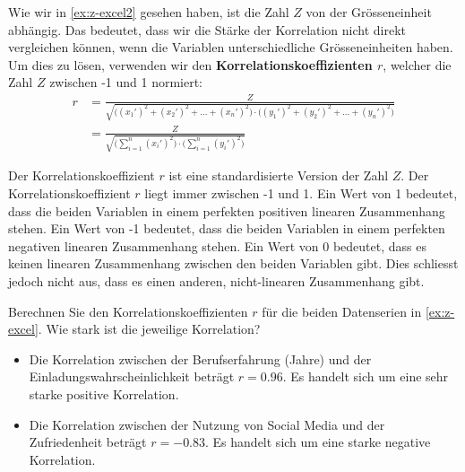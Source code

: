 Wie wir in \cref{ex:z-excel2} gesehen haben, ist die Zahl \(Z\) von der Grösseneinheit abhängig. Das bedeutet, dass wir die Stärke der Korrelation nicht direkt vergleichen können, wenn die Variablen unterschiedliche Grösseneinheiten haben. Um dies zu lösen, verwenden wir den \textbf{Korrelationskoeffizienten \(r\)}, welcher die Zahl \(Z\) zwischen -1 und 1 normiert:
\begin{equation}
    \begin{aligned}
        r      & = \frac{Z}{\sqrt{\Big((x_1')^2 + (x_2')^2 + \dots + (x_n')^2\Big) \cdot \Big((y_1')^2 + (y_2')^2 + \dots + (y_n')^2\Big)}} \\
         & = \frac{Z}{\sqrt{\Big(\sum_{i=1}^n (x_i')^2\Big) \cdot \Big(\sum_{i=1}^n (y_i')^2\Big)}}
    \end{aligned}
\end{equation}


Der Korrelationskoeffizient \(r\) ist eine standardisierte Version der Zahl \(Z\). Der Korrelationskoeffizient \(r\) liegt immer zwischen -1 und 1. Ein Wert von 1 bedeutet, dass die beiden Variablen in einem perfekten positiven linearen Zusammenhang stehen. Ein Wert von -1 bedeutet, dass die beiden Variablen in einem perfekten negativen linearen Zusammenhang stehen. Ein Wert von 0 bedeutet, dass es keinen linearen Zusammenhang zwischen den beiden Variablen gibt. Dies schliesst jedoch nicht aus, dass es einen anderen, nicht-linearen Zusammenhang gibt.

\begin{myexercise}
    Berechnen Sie den Korrelationskoeffizienten \(r\) für die beiden Datenserien in \cref{ex:z-excel}. Wie stark ist die jeweilige Korrelation?
    \begin{myanswer}
        \begin{itemize}
            \item Die Korrelation zwischen der Berufserfahrung (Jahre) und der Einladungswahrscheinlichkeit beträgt \(r = 0.96\). Es handelt sich um eine sehr starke positive Korrelation.
            \item Die Korrelation zwischen der Nutzung von Social Media und der Zufriedenheit beträgt \(r = -0.83\). Es handelt sich um eine starke negative Korrelation.
        \end{itemize}
    \end{myanswer}
\end{myexercise}

